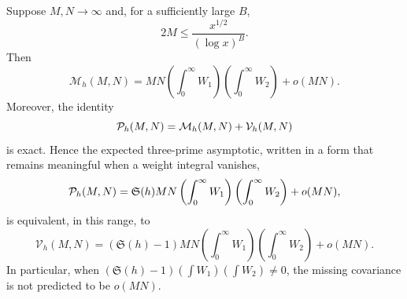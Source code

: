 \begin{proposition}
\label{prop:marginal-covariance-ledger}
Suppose $M,N\to\infty$ and, for a sufficiently large $B$,
\begin{equation}\label{eq:marginal-bv-range}
 2M\leq\frac{x^{1/2}}{(\log x)^B}.
\end{equation}
Then
\begin{equation}\label{eq:prime-target-marginal-asymptotic}
 \mathcal M_h(M,N)
 =MN\left(\int_0^\infty W_1\right)
     \left(\int_0^\infty W_2\right)
 +o(MN).
\end{equation}
Moreover, the identity
\begin{equation}\label{eq:exact-marginal-covariance-ledger}
 \mathcal P_h(M,N)=\mathcal M_h(M,N)+\mathcal V_h(M,N)
\end{equation}
is exact.  Hence the expected three-prime asymptotic, written in a form
that remains meaningful when a weight integral vanishes,
\begin{equation}\label{eq:conjectural-three-prime-main}
 \mathcal P_h(M,N)
 =\mathfrak S(h)MN
 \left(\int_0^\infty W_1\right)
 \left(\int_0^\infty W_2\right)
 +o(MN),
\end{equation}
is equivalent, in this range, to
\begin{equation}\label{eq:required-covariance-main}
 \mathcal V_h(M,N)
 =(\mathfrak S(h)-1)MN
 \left(\int_0^\infty W_1\right)
 \left(\int_0^\infty W_2\right)
 +o(MN).
\end{equation}
In particular, when
$(\mathfrak S(h)-1)(\int W_1)(\int W_2)\ne0$, the missing covariance is not
predicted to be $o(MN)$.
\end{proposition}


